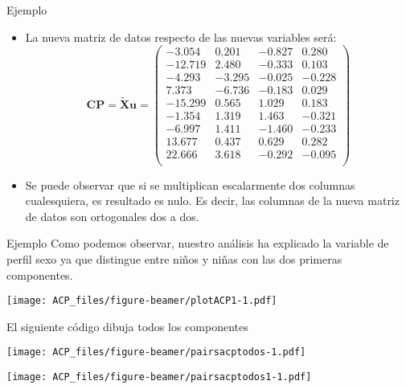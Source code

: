 \documentclass[
  spanish,
  ignorenonframetext,
]{beamer}
\newenvironment{Shaded}{\begin{snugshade}}{\end{snugshade}}
\newcommand{\DataTypeTok}[1]{\textcolor[rgb]{0.13,0.29,0.53}{#1}}
\newcommand{\DecValTok}[1]{\textcolor[rgb]{0.00,0.00,0.81}{#1}}
\newcommand{\KeywordTok}[1]{\textcolor[rgb]{0.13,0.29,0.53}{\textbf{#1}}}
\newcommand{\NormalTok}[1]{#1}
\newcommand{\OperatorTok}[1]{\textcolor[rgb]{0.81,0.36,0.00}{\textbf{#1}}}
\newcommand{\StringTok}[1]{\textcolor[rgb]{0.31,0.60,0.02}{#1}}
\begin{document}
\begin{frame}{Ejemplo}
\protect\hypertarget{ejemplo-4}{}
\begin{itemize}
\item
  La nueva matriz de datos respecto de las nuevas variables será: \[
  \mathbf{CP}= \tilde{\mathbf{X}} \mathbf{u} =
  \left(
  \begin{array}{rrrr}
  -3.054 & 0.201 & -0.827 & 0.280 \\
  -12.719 & 2.480 & -0.333 & 0.103 \\
  -4.293 & -3.295 & -0.025 & -0.228 \\
  7.373 & -6.736 & -0.183 & 0.029 \\
  -15.299 & 0.565 & 1.029 & 0.183 \\
  -1.354 & 1.319 & 1.463 & -0.321 \\
  -6.997 & 1.411 & -1.460 & -0.233 \\
  13.677 & 0.437 & 0.629 & 0.282 \\
  22.666 & 3.618 & -0.292 & -0.095 \\
  \end{array}
  \right)
  \]
\item
  Se puede observar que si se multiplican escalarmente dos columnas
  cualesquiera, es resultado es nulo. Es decir, las columnas de la nueva
  matriz de datos son ortogonales dos a dos.
\end{itemize}
\end{frame}

\begin{frame}[fragile]{Ejemplo}
\protect\hypertarget{ejemplo-5}{}
Como podemos observar, nuestro análisis ha explicado la variable de
perfil sexo ya que distingue entre niños y niñas con las dos primeras
componentes.

\texttt{[image: ACP\_files/figure-beamer/plotACP1-1.pdf]}

El siguiente código dibuja todos los componentes

\begin{Shaded}
\end{Shaded}

\texttt{[image: ACP\_files/figure-beamer/pairsacptodos-1.pdf]}

\texttt{[image: ACP\_files/figure-beamer/pairsacptodos1-1.pdf]}
\end{frame}
\end{document}
